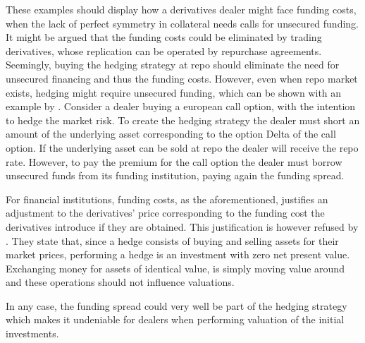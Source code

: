 \documentclass[main.tex]{subfiles}
\begin{document}
        These examples should display how a derivatives dealer might face funding costs,
        when the lack of perfect symmetry in collateral needs calls for unsecured funding.
        It might be argued that the funding costs could be eliminated by trading derivatives,
        whose replication can be operated by repurchase agreements. 
        Seemingly, buying the hedging strategy at repo should eliminate the need for unsecured financing
        and thus the funding costs. 
        However, even when repo market exists, hedging might require unsecured funding,
        which can be shown with an example by \textcite{Castagna2012FVA}.
        Consider a dealer buying a european call option, with the intention to hedge the market risk.
        To create the hedging strategy the dealer must short an amount of the underlying asset corresponding to the option Delta of the call option.
        If the underlying asset can be sold at repo the dealer will receive the repo rate.
        However, to pay the premium for the call option the dealer must borrow unsecured funds from its funding institution,
        paying again the funding spread. 

        For financial institutions, funding costs, as the aforementioned, justifies an adjustment 
        to the derivatives' price corresponding to the funding cost the derivatives introduce if they are obtained.
        This justification is however refused by \textcite{HullWhite2012FVA}.
        They state that, since a hedge consists of buying and selling assets for their market prices,
        performing a hedge is an investment with zero net present value.
        Exchanging money for assets of identical value,
        is simply moving value around and these operations should not influence valuations. 

        In any case,
        the funding spread could very well be part of the hedging strategy which makes it undeniable for dealers when performing valuation of the initial investments.
\end{document}
